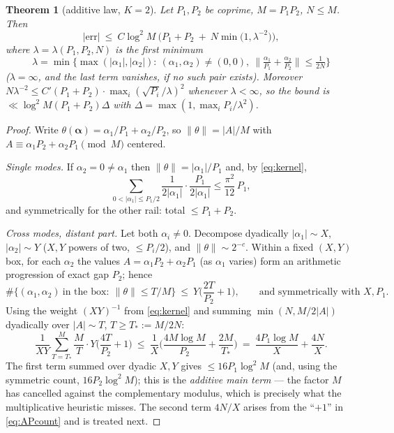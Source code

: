 \documentclass[11pt]{article}
\newtheorem{theorem}{Theorem}
\newcommand{\nrm}[1]{\lVert #1\rVert}
\begin{document}
\begin{theorem}[additive law, $K=2$]\label{thm:two}
Let $P_1,P_2$ be coprime, $M=P_1P_2$, $N\le M$.  Then
\[
|\mathrm{err}|\ \le\ C\log^2M\ \Big(P_1+P_2\ +\ N\min\big(1,\lambda^{-2}\big)\Big),
\]
where $\lambda=\lambda(P_1,P_2,N)$ is the first minimum
\[
\lambda=\min\Big\{\max(|\alpha_1|,|\alpha_2|):\ (\alpha_1,\alpha_2)\ne(0,0),\
\nrm{\tfrac{\alpha_1}{P_1}+\tfrac{\alpha_2}{P_2}}\le\tfrac1{2N}\Big\}
\]
($\lambda=\infty$, and the last term vanishes, if no such pair exists).
Moreover $N\lambda^{-2}\le C'(P_1+P_2)\cdot\max_i(\sqrt{P_i}/\lambda)^2$
whenever $\lambda<\infty$, so the bound is
$\ll\log^2M(P_1+P_2)\Delta$ with $\Delta=\max(1,\max_i P_i/\lambda^2)$.
\end{theorem}

\begin{proof}
Write $\theta(\boldsymbol\alpha)=\alpha_1/P_1+\alpha_2/P_2$, so
$\nrm{\theta}=|A|/M$ with $A\equiv\alpha_1P_2+\alpha_2P_1 \pmod M$ centered.

\emph{Single modes.}  If $\alpha_2=0\ne\alpha_1$ then $\nrm\theta=|\alpha_1|/P_1$
and, by \eqref{eq:kernel},
\[
\sum_{0<|\alpha_1|\le P_1/2}\frac{1}{2|\alpha_1|}\cdot\frac{P_1}{2|\alpha_1|}
\le\frac{\pi^2}{12}\,P_1 ,
\]
and symmetrically for the other rail: total $\le P_1+P_2$.

\emph{Cross modes, distant part.}  Let both $\alpha_i\ne0$.  Decompose
dyadically $|\alpha_1|\sim X$, $|\alpha_2|\sim Y$ ($X,Y$ powers of two,
$\le P_i/2$), and $\nrm\theta\sim 2^{-c}$.  Within a fixed $(X,Y)$ box, for each
$\alpha_2$ the values $A=\alpha_1P_2+\alpha_2P_1$ (as $\alpha_1$ varies) form an
arithmetic progression of exact gap $P_2$; hence
\begin{equation}\label{eq:APcount}
\#\{(\alpha_1,\alpha_2)\ \text{in the box}:\ \nrm{\theta}\le T/M\}
\ \le\ Y\Big(\frac{2T}{P_2}+1\Big),
\qquad\text{and symmetrically with }X,P_1 .
\end{equation}
Using the weight $(XY)^{-1}$ from \eqref{eq:kernel} and summing
$\min(N,M/2|A|)$ dyadically over $|A|\sim T$, $T\ge T_*:=M/2N$:
\[
\frac{1}{XY}\sum_{T=T_*}^{M}\frac{M}{T}\cdot Y\Big(\frac{4T}{P_2}+1\Big)
\ \le\ \frac{1}{X}\Big(\frac{4M\log M}{P_2}+\frac{2M}{T_*}\Big)
\ =\ \frac{4P_1\log M}{X}+\frac{4N}{X}.
\]
The first term summed over dyadic $X,Y$ gives $\le 16P_1\log^2M$ (and, using the
symmetric count, $16P_2\log^2 M$); this is the \emph{additive main term} --- the
factor $M$ has cancelled against the complementary modulus, which is precisely
what the multiplicative heuristic misses.  The second term $4N/X$ arises from the
``$+1$'' in \eqref{eq:APcount} and is treated next.


\end{proof}
\end{document}
